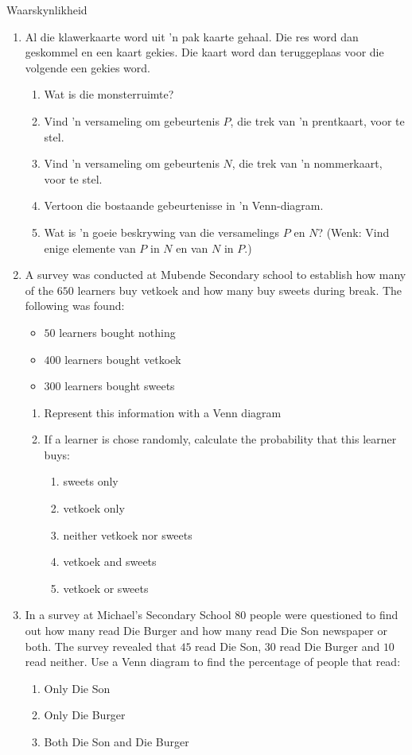 \begin{eocexercises}{Waarskynlikheid}
\begin{enumerate}[itemsep=5pt, label=\textbf{\arabic*}.]
  \item Al die klawerkaarte word uit 'n pak kaarte gehaal. Die res word dan geskommel en een kaart gekies. Die kaart word dan teruggeplaas voor die volgende een gekies word.
    \begin{enumerate}[noitemsep, label=\textbf{(\alph*)} ]
    \item Wat is die monsterruimte?
    \item Vind 'n versameling om gebeurtenis $P$, die trek van 'n prentkaart, voor te stel.
    \item Vind 'n versameling om gebeurtenis $N$, die trek van 'n nommerkaart, voor te stel.
    \item Vertoon die bostaande gebeurtenisse in 'n Venn-diagram.
    \item Wat is 'n goeie beskrywing van die versamelings $P$ en $N$?
      (Wenk: Vind enige elemente van $P$ in $N$ en van $N$ in $P$.)
    \end{enumerate}

  \item A survey was conducted at Mubende Secondary school to establish how many of the $650$ learners buy vetkoek and how many buy sweets during break. The following was found:
\begin{itemize}
 \item $50$ learners bought nothing
\item $400$ learners bought vetkoek
\item $300$ learners bought sweets
\end{itemize}
\begin{enumerate}[noitemsep, label=\textbf{(\alph*)} ]
 \item Represent this information with a Venn diagram
\item If a learner is chose randomly, calculate the probability that this learner buys:
\begin{enumerate}[noitemsep, label=\roman*. ]
 \item sweets only
\item vetkoek only
\item neither vetkoek nor sweets
\item vetkoek and sweets
\item vetkoek or sweets
\end{enumerate}
\end{enumerate}
\item In a survey at Michael's Secondary School $80$ people were questioned to find out how many read Die Burger and how many read Die Son newspaper or both. The survey revealed that $45$ read Die Son, $30$ read Die Burger and $10$ read neither. Use a Venn diagram to find the percentage of people that read:
\begin{enumerate}[noitemsep, label=\textbf{(\alph*)} ]
 \item Only Die Son
\item Only Die Burger
\item Both Die Son and Die Burger
\end{enumerate}


\end{enumerate}
\end{eocexercises}
